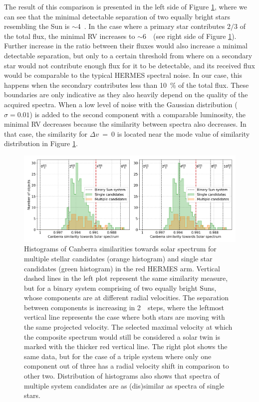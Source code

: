 The result of this comparison is presented in the left side of Figure \ref{fig:rv_similarity}, where we can see that the minimal detectable separation of two equally bright stars resembling the Sun is $\sim$4~\kms. In the case where a primary star contributes $2/3$ of the total flux, the minimal RV increases to $\sim$6~\kms\ (see right side of Figure \ref{fig:rv_similarity}). Further increase in the ratio between their fluxes would also increase a minimal detectable separation, but only to a certain threshold from where on a secondary star would not contribute enough flux for it to be detectable, and its received flux would be comparable to the typical HERMES spectral noise. In our case, this happens when the secondary contributes less than 10~\% of the total flux. These boundaries are only indicative as they also heavily depend on the quality of the acquired spectra. When a low level of noise with the Gaussian distribution ($\sigma=0.01$) is added to the second component with a comparable luminosity, the minimal RV decreases because the similarity between spectra also decreases. In that case, the similarity for $\Delta v$~=~0 is located near the mode value of similarity distribution in Figure \ref{fig:rv_similarity}. 

\begin{figure}
	\centering
	\includegraphics[width=\textwidth]{sinlg_multi_sim_b3_50_50_comb.png}
	\caption{Histograms of Canberra similarities towards solar spectrum for multiple stellar candidates (orange histogram) and single star candidates (green histogram) in the red HERMES arm. Vertical dashed lines in the left plot represent the same similarity measure, but for a binary system comprising of two equally bright Suns, whose components are at different radial velocities. The separation between components is increasing in 2~\kms\ steps, where the leftmost vertical line represents the case where both stars are moving with the same projected velocity. The selected maximal velocity at which the composite spectrum would still be considered a solar twin is marked with the thicker red vertical line. The right plot shows the same data, but for the case of a triple system where only one component out of three has a radial velocity shift in comparison to other two. Distribution of histograms also shows that spectra of multiple system candidates are as (dis)similar as spectra of single stars.}
	\label{fig:rv_similarity}
\end{figure}

